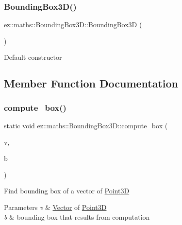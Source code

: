 \subsubsection{\texorpdfstring{Bounding\+Box3\+D()}{BoundingBox3D()}}
{\footnotesize\ttfamily ez\+::maths\+::\+Bounding\+Box3\+D\+::\+Bounding\+Box3D (\begin{DoxyParamCaption}{ }\end{DoxyParamCaption})\hspace{0.3cm}{\ttfamily [inline]}}

Default constructor 

\subsection{Member Function Documentation}
\mbox{\label{classez_1_1maths_1_1BoundingBox3D_a64f9ec4f9a6f62e9d253526733f630d5}} 
\subsubsection{\texorpdfstring{compute\+\_\+box()}{compute\_box()}}
{\footnotesize\ttfamily static void ez\+::maths\+::\+Bounding\+Box3\+D\+::compute\+\_\+box (\begin{DoxyParamCaption}\item[{\hyperlink{classez_1_1objects_1_1Vector}{ez\+::objects\+::\+Vector}$<$ \hyperlink{classez_1_1maths_1_1Point3D}{Point3D} $>$ \&}]{v,  }\item[{\hyperlink{classez_1_1maths_1_1BoundingBox3D}{Bounding\+Box3D} \&}]{b }\end{DoxyParamCaption})\hspace{0.3cm}{\ttfamily [static]}}

Find bounding box of a vector of \hyperlink{classez_1_1maths_1_1Point3D}{Point3D} 
\begin{DoxyParams}{Parameters}
{\em v} & \hyperlink{classez_1_1maths_1_1Vector}{Vector} of \hyperlink{classez_1_1maths_1_1Point3D}{Point3D} \\
\hline
{\em b} & bounding box that results from computation \\
\hline
\end{DoxyParams}
\mbox{\label{classez_1_1maths_1_1BoundingBox3D_ab69a5ee522212f8b8c0bf8ab7368620c}} 
